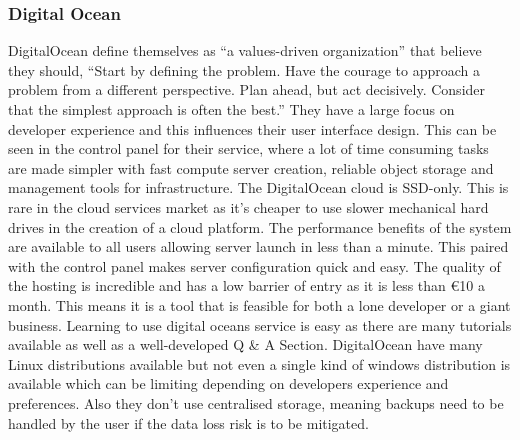 \documentclass[12pt]{article}
\begin{document}
        \subsubsection{Digital Ocean}
DigitalOcean define themselves as “a values-driven organization” that believe they should, “Start by defining the problem. Have the courage to approach a problem from a different perspective. Plan ahead, but act decisively. Consider that the simplest approach is often the best.” \cite{technologyDigitalOceanQuote} They have a large focus on developer experience and this influences their user interface design. This can be seen in the control panel for their service, where a lot of time consuming tasks are made simpler with fast compute server creation, reliable object storage and management tools for infrastructure.\bigbreak 
\noindent
The DigitalOcean cloud is SSD-only. This is rare in the cloud services market as it’s cheaper to use slower mechanical hard drives in the creation of a cloud platform. The performance benefits of the system are available to all users allowing server launch in less than a minute. This paired with the control panel makes server configuration quick and easy.\bigbreak 
\noindent
The quality of the hosting is incredible and has a low barrier of entry as it is less than \euro{}10 a month. This means it is a tool that is feasible for both a lone developer or a giant business. Learning to use digital oceans service is easy as there are many tutorials available as well as a well-developed Q \& A Section.\bigbreak 
\noindent
DigitalOcean have many Linux distributions available but not even a single kind of windows distribution is available which can be limiting depending on developers experience and preferences. Also they don’t use centralised storage, meaning backups need to be handled by the user if the data loss risk is to be mitigated.
\end{document}
